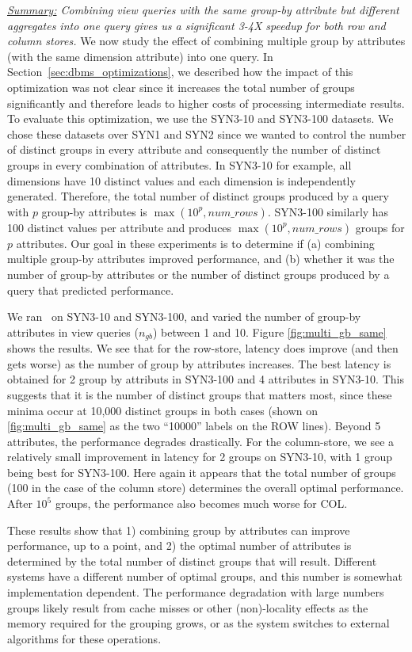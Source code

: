 {\em \underline{Summary:} Combining view queries with the same group-by attribute
but different aggregates into one query gives us a significant 
3-4X speedup for both row and column stores.}
We now study the effect of combining multiple group by attributes (with the
same dimension attribute) into one query.
In Section~\ref{sec:dbms_optimizations}, we described
 how the impact of this optimization was not
clear since it increases the total number of groups significantly and therefore
leads to higher costs of processing intermediate results.
To evaluate this optimization, we use the SYN3-10 and SYN3-100 datasets.
We chose these datasets over SYN1 and SYN2 since we wanted to control
the number of distinct groups in every attribute and consequently the number of
distinct groups in every combination of attributes.
In SYN3-10 for example, all dimensions have 10 distinct values and each
dimension is independently generated. 
Therefore, the total number of distinct
groups produced by a query with $p$ group-by attributes is $\max(10^p,
num\_rows)$.
SYN3-100 similarly has 100 distinct values per attribute and produces
$\max(10^p, num\_rows)$ groups for $p$ attributes.
Our goal in these experiments is to determine if (a) combining multiple
group-by attributes improved performance, and (b) whether it was the number of
group-by attributes or the number of distinct groups produced by a query that
predicted performance.

We ran \SeeDB\ on SYN3-10 and SYN3-100, and varied the number of
group-by attributes in view queries ($n_{gb}$) between 1 and 10.
Figure \ref{fig:multi_gb_same} shows the results.
We see that for the row-store, latency does improve (and then gets worse) as the
number of group by attributes increases.  The best latency is obtained for 2
group by attributs in SYN3-100 and 4 attributes in SYN3-10.  This suggests
that it is the number of distinct groups that matters most, since these minima occur at 
10,000 distinct groups in both cases (shown on \ref{fig:multi_gb_same} as the two ``10000'' labels on the ROW lines).
Beyond 5 attributes, the performance degrades drastically.  
 For the column-store, we see a
relatively small improvement in latency for 2 groups on SYN3-10, with 1 group being best for
SYN3-100.  Here again it appears that the total number of groups (100 in the case of the column store) determines
the overall optimal performance.
After $10^5$ groups, the performance also becomes much worse for COL.

These results show that 1) combining group by attributes can improve performance, up to a point, and 2) the optimal
number of attributes is determined by the total number of distinct groups that will result.  Different systems have a different
number of optimal groups, and this number is somewhat implementation dependent.  The performance degradation with
large numbers groups likely result from cache misses or other (non)-locality effects
as the memory required for the grouping grows, or as the system switches to external algorithms for these
operations.

